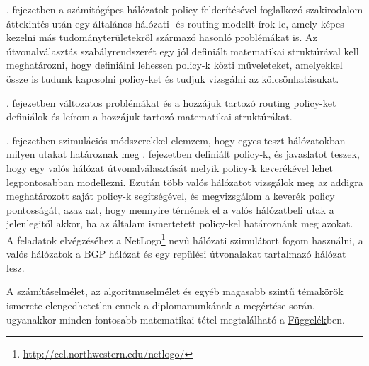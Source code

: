 . fejezetben a számítógépes hálózatok policy-felderítésével foglalkozó szakirodalom áttekintés után egy általános hálózati- és routing modellt írok le, amely képes kezelni más tudományterületekről származó hasonló problémákat is. Az útvonalválasztás szabályrendszerét egy jól definiált matematikai struktúrával kell meghatározni, hogy definiálni lehessen policy-k közti műveleteket, amelyekkel össze is tudunk kapcsolni policy-ket és tudjuk vizsgálni az kölcsönhatásukat.

. fejezetben változatos problémákat és a hozzájuk tartozó routing policy-ket definiálok és leírom a hozzájuk tartozó matematikai struktúrákat.

. fejezetben szimulációs módszerekkel elemzem, hogy egyes teszt-hálózatokban milyen utakat határoznak meg . fejezetben definiált policy-k, és javaslatot teszek, hogy egy valós hálózat útvonalválasztását melyik policy-k keverékével lehet legpontosabban modellezni. Ezután több valós hálózatot vizsgálok meg az addigra meghatározott saját policy-k segítségével, és megvizsgálom a keverék policy pontosságát, azaz azt, hogy mennyire térnének el a valós hálózatbeli utak a jelenlegitől akkor, ha az általam ismertetett policy-kel határoznánk meg azokat.
\newline
\newline
A feladatok elvégzéséhez a NetLogo\footnote{\url{http://ccl.northwestern.edu/netlogo/}} nevű hálózati szimulátort fogom használni, a valós hálózatok a BGP hálózat és egy repülési útvonalakat tartalmazó hálózat lesz.


A számításelmélet, az algoritmuselmélet és egyéb magasabb szintű témakörök ismerete elengedhetetlen ennek a diplomamunkának a megértése során, ugyanakkor minden fontosabb matematikai tétel megtalálható a \hyperlink{appendix}{Függelék}ben.




